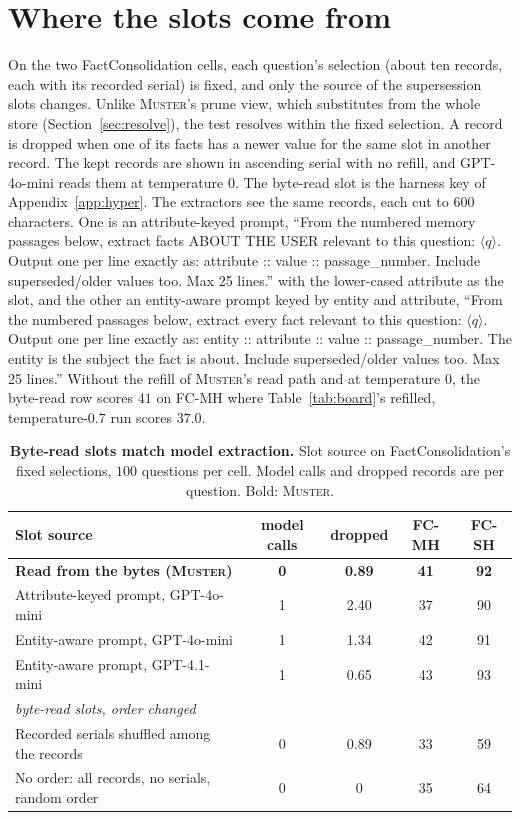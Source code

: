 \documentclass{article}
\newcommand{\ours}{\rowcolor{oursbg}}
\newcommand{\tabfont}{\fontsize{7.5}{8.5}\selectfont\renewcommand{\arraystretch}{1.0}}
\newcommand{\sys}{\textsc{Muster}}
\begin{document}
\section{Where the slots come from}\label{app:slotsrc}

On the two FactConsolidation cells, each question's selection (about ten records, each with its recorded
serial) is fixed, and only the source of the supersession slots changes. Unlike \sys{}'s prune view, which substitutes from the whole store (Section~\ref{sec:resolve}), the test resolves within the fixed selection. A record is dropped when one of
its facts has a newer value for the same slot in another record. The kept records are shown in ascending
serial with no refill, and GPT-4o-mini reads them at temperature $0$. The byte-read slot is the harness key
of Appendix~\ref{app:hyper}. The extractors see the same records, each cut to $600$ characters. One is an attribute-keyed prompt, ``From the numbered memory passages below, extract
facts ABOUT THE USER relevant to this question: $\langle q\rangle$. Output one per line exactly as:
attribute :: value :: passage\_number. Include superseded/older values too. Max 25 lines.'' with the lower-cased attribute as the slot, and the other an entity-aware prompt keyed by entity and attribute,
``From the numbered passages below, extract every fact relevant to this question: $\langle q\rangle$.
Output one per line exactly as: entity :: attribute :: value :: passage\_number. The entity is the
subject the fact is about. Include superseded/older values too. Max 25 lines.'' Without the refill of
\sys{}'s read path and at temperature $0$, the byte-read row scores $41$ on FC-MH where Table~\ref{tab:board}'s
refilled, temperature-$0.7$ run scores $37.0$.

\begin{table}[H]
\centering\tabfont
\caption{\textbf{Byte-read slots match model extraction.} Slot source on FactConsolidation's fixed selections, $100$ questions per cell. Model calls and dropped records are per question. Bold: \sys{}.}
\label{tab:slotsrc}
\begin{tabular}{lcccc}
\toprule
Slot source & model calls & dropped & FC-MH & FC-SH \\
\midrule
\ours \textbf{Read from the bytes (\sys{})} & \textbf{0} & \textbf{0.89} & \textbf{41} & \textbf{92} \\
Attribute-keyed prompt, GPT-4o-mini & 1 & 2.40 & 37 & 90 \\
Entity-aware prompt, GPT-4o-mini & 1 & 1.34 & 42 & 91 \\
Entity-aware prompt, GPT-4.1-mini & 1 & 0.65 & 43 & 93 \\
\midrule
\multicolumn{5}{l}{\emph{byte-read slots, order changed}}\\
Recorded serials shuffled among the records & 0 & 0.89 & 33 & 59 \\
No order: all records, no serials, random order & 0 & 0 & 35 & 64 \\
\bottomrule
\end{tabular}
\end{table}
\end{document}
